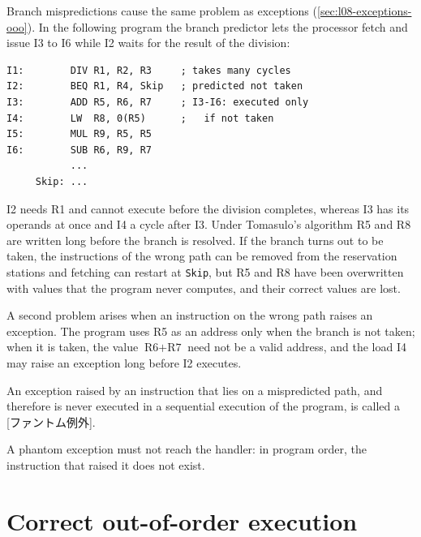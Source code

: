 \documentclass[../main.tex]{subfiles}
\begin{document}
Branch mispredictions cause the same problem as exceptions
(\cref{sec:l08-exceptions-ooo}).  In the following program the branch predictor lets the processor
fetch and issue I3 to I6 while I2 waits for the result of the division:
\begin{lstlisting}[language={[x86masm]Assembler}, numbers=none]
I1:        DIV R1, R2, R3     ; takes many cycles
I2:        BEQ R1, R4, Skip   ; predicted not taken
I3:        ADD R5, R6, R7     ; I3-I6: executed only
I4:        LW  R8, 0(R5)      ;   if not taken
I5:        MUL R9, R5, R5
I6:        SUB R6, R9, R7
           ...
     Skip: ...
\end{lstlisting}
I2 needs R1 and cannot execute before the division completes, whereas I3 has
its operands at once and I4 a cycle after I3.  Under Tomasulo's algorithm R5
and R8 are written long before the branch is resolved.  If the branch turns
out to be taken, the instructions of the wrong path can be removed from the
reservation stations and fetching can restart at \texttt{Skip}, but R5 and R8
have been overwritten with values that the program never computes, and their
correct values are lost.

A second problem arises when an instruction on the wrong path raises an
exception.  The program uses R5 as an address only when the branch is not
taken; when it is taken, the value $\text{R6}+\text{R7}$ need not be a valid
address, and the load I4 may raise an exception long before I2 executes.

\begin{definition}
  \label{def:l08-phantom}
  An exception raised by an instruction that lies on a mispredicted path, and
  therefore is never executed in a sequential execution of the program, is
  called a [ファントム例外].
\end{definition}

A phantom exception must not reach the handler: in program order, the
instruction that raised it does not exist.

\section{Correct out-of-order execution}
\label{sec:l08-correct}
\end{document}
